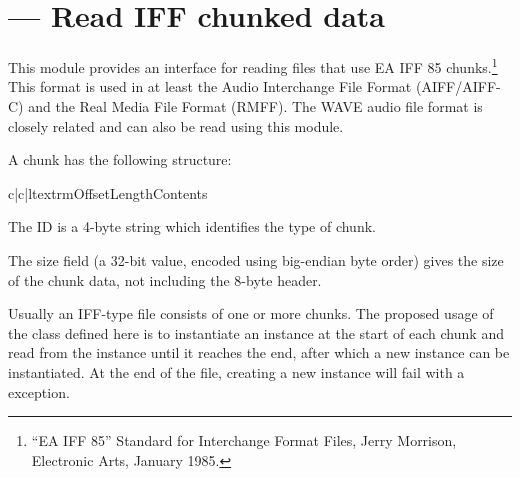 \section{ ---
	 Read IFF chunked data}




This module provides an interface for reading files that use EA IFF 85
chunks.\footnote{``EA IFF 85'' Standard for Interchange Format Files,
Jerry Morrison, Electronic Arts, January 1985.}  This format is used
in at least the Audio Interchange File Format
(AIFF/AIFF-C) and the Real Media File
Format (RMFF).  The WAVE audio file format is closely
related and can also be read using this module.

A chunk has the following structure:

\begin{tableiii}{c|c|l}{textrm}{Offset}{Length}{Contents}
\end{tableiii}

The ID is a 4-byte string which identifies the type of chunk.

The size field (a 32-bit value, encoded using big-endian byte order)
gives the size of the chunk data, not including the 8-byte header.

Usually an IFF-type file consists of one or more chunks.  The proposed
usage of the  class defined here is to instantiate an
instance at the start of each chunk and read from the instance until
it reaches the end, after which a new instance can be instantiated.
At the end of the file, creating a new instance will fail with a
 exception.

